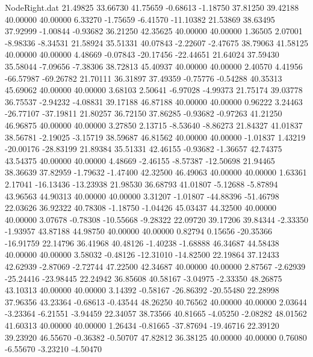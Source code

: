 \begin{filecontents}{NodeRight.dat}
  21.49825   33.66730   41.75659    -0.68613   -1.18750   37.81250   39.42188   40.00000   40.00000    6.33270   -1.75659   -6.41570  -11.10382
  21.53869   38.63495   37.92999    -1.00844   -0.93682   36.21250   42.35625   40.00000   40.00000    1.36505    2.07001   -8.98336   -8.34531
  21.58924   35.51331   40.07843    -2.22607   -2.47675   38.79063   41.58125   40.00000   40.00000    4.48669   -0.07843  -20.17456  -22.44651
  21.64024   37.59430   35.58044    -7.09656   -7.38306   38.72813   45.40937   40.00000   40.00000    2.40570    4.41956  -66.57987  -69.26782
  21.70111   36.31897   37.49359    -0.75776   -0.54288   40.35313   45.69062   40.00000   40.00000    3.68103    2.50641   -6.97028   -4.99373
  21.75174   39.03778   36.75537    -2.94232   -4.08831   39.17188   46.87188   40.00000   40.00000    0.96222    3.24463  -26.77107  -37.19811
  21.80257   36.72150   37.86285    -0.93682   -0.97263   41.21250   46.96875   40.00000   40.00000    3.27850    2.13715   -8.53640   -8.86273
  21.84327   41.01837   38.56781    -2.19025   -3.15719   38.59687   46.81562   40.00000   40.00000   -1.01837    1.43219  -20.00176  -28.83199
  21.89384   35.51331   42.46155    -0.93682   -1.36657   42.74375   43.54375   40.00000   40.00000    4.48669   -2.46155   -8.57387  -12.50698
  21.94465   38.36639   37.82959    -1.79632   -1.47400   42.32500   46.49063   40.00000   40.00000    1.63361    2.17041  -16.13436  -13.23938
  21.98530   36.68793   41.01807    -5.12688   -5.87894   43.96563   44.90313   40.00000   40.00000    3.31207   -1.01807  -44.88396  -51.46798
  22.03626   36.92322   40.78308    -1.18750   -1.04426   45.03437   44.32500   40.00000   40.00000    3.07678   -0.78308  -10.55668   -9.28322
  22.09720   39.17206   39.84344    -2.33350   -1.93957   43.87188   44.98750   40.00000   40.00000    0.82794    0.15656  -20.35366  -16.91759
  22.14796   36.41968   40.48126    -1.40238   -1.68888   46.34687   44.58438   40.00000   40.00000    3.58032   -0.48126  -12.31010  -14.82500
  22.19864   37.12433   42.62939    -2.87069   -2.72744   47.22500   42.34687   40.00000   40.00000    2.87567   -2.62939  -25.24416  -23.98445
  22.24942   36.85608   40.58167    -3.04975   -2.33350   48.26875   43.10313   40.00000   40.00000    3.14392   -0.58167  -26.86392  -20.55480
  22.28998   37.96356   43.23364    -0.68613   -0.43544   48.26250   40.76562   40.00000   40.00000    2.03644   -3.23364   -6.21551   -3.94459
  22.34057   38.73566   40.81665    -4.05250   -2.08282   48.01562   41.60313   40.00000   40.00000    1.26434   -0.81665  -37.87694  -19.46716
  22.39120   39.23920   46.55670    -0.36382   -0.50707   47.82812   36.38125   40.00000   40.00000    0.76080   -6.55670   -3.23210   -4.50470

\end{filecontents}
